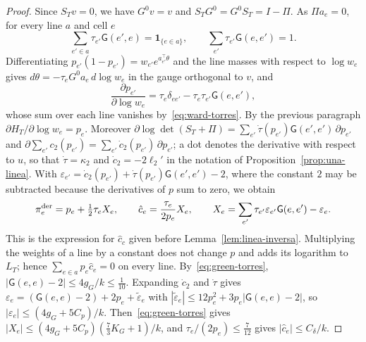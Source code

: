 \begin{proof}
Since $S_Tv=0$, we have $G^0v=v$ and $S_TG^0=G^0S_T=I-\Pi$. As $\Pi a_e=0$, for every line $a$ and cell $e$
\begin{equation}\label{eq:ward-torres}
 \sum_{e'\in a}\tau_{e'}\mathsf G(e',e)=\mathbf1_{\{e\in a\}},\qquad
 \sum_{e'}\tau_{e'}\mathsf G(e,e')=1 .
\end{equation}
Differentiating $p_{e'}(1-p_{e'})=w_{e'}e^{a_{e'}^\top\theta}$ and the line masses with respect to
$\log w_e$ gives $d\theta=-\tau_eG^0a_e\,d\log w_e$ in the gauge orthogonal to $v$, and
\[
 \frac{\partial p_{e'}}{\partial\log w_e}=\tau_e\delta_{ee'}-\tau_e\tau_{e'}\mathsf G(e,e'),
\]
whose sum over each line vanishes by~\eqref{eq:ward-torres}. By the previous paragraph $\partial
H_T/\partial\log w_e=p_e$. Moreover $\partial\log\det(S_T+\Pi)=\sum_{e'}\dot\tau(p_{e'})\mathsf
G(e',e')\,\partial p_{e'}$ and $\partial\sum_{e'}c_2(p_{e'})=\sum_{e'}\dot c_2(p_{e'})\,\partial p_{e'}$; a
dot denotes the derivative
with respect to $u$, so that $\dot\tau=\kappa_2$ and $\dot c_2=-2\ell_2'$ in the notation of
Proposition~\ref{prop:una-linea}.
With $\varepsilon_{e'}=\dot c_2(p_{e'})+\dot\tau(p_{e'})\mathsf G(e',e')-2$, where the constant $2$ may be
subtracted because the derivatives of $p$ sum to zero, we obtain
\begin{equation}\label{eq:chat-torres}
 \pi_e^{\rm der}=p_e+\tfrac12\tau_eX_e,\qquad \hat c_e=\frac{\tau_e}{2p_e}X_e,\qquad
 X_e=\sum_{e'}\tau_{e'}\varepsilon_{e'}\mathsf G(e,e')-\varepsilon_e .
\end{equation}
This is the expression for $\hat c_c$ given before Lemma~\ref{lem:linea-inversa}. Multiplying the weights
of a line by a constant does not change $p$ and adds its logarithm to $L_T$; hence
$\sum_{e\in a}p_e\hat c_e=0$ on every line. By~\eqref{eq:green-torres}, $|\mathsf G(e,e)-2|\le4g_G/k
\le\tfrac1{10}$. Expanding $\dot c_2$ and $\dot\tau$ gives $\varepsilon_e=(\mathsf G(e,e)-2)+2p_e+\tilde
\varepsilon_e$ with $|\tilde\varepsilon_e|\le12p_e^2+3p_e|\mathsf G(e,e)-2|$, so
$|\varepsilon_e|\le(4g_G+5C_p)/k$. Then~\eqref{eq:green-torres} gives
$|X_e|\le(4g_G+5C_p)(\tfrac73K_G+1)/k$, and $\tau_e/(2p_e)\le\tfrac7{12}$ gives $|\hat c_e|\le
C_\delta/k$.


\end{proof}
